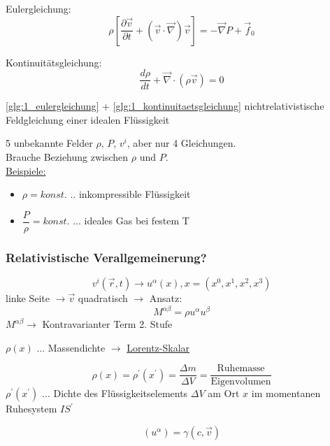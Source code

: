 \documentclass[a4paper, 11pt]{article}
\numberwithin{equation}{section}
\begin{document}
Eulergleichung:
\begin{equation}
\rho \left[ \dfrac{\partial \vec{v}}{\partial t} + \left( \vec{v} \cdot \vec{\nabla} \right) \vec{v} \right] = - \vec{\nabla} P + \vec{f}_0
\label{glg:1_eulergleichung}
\end{equation}

Kontinuitätsgleichung:
\begin{equation}
\dfrac{d \rho}{dt} + \vec{\nabla} \cdot \left( \rho \vec{v} \right) = 0
\label{glg:1_kontinuitaetsgleichung}
\end{equation}

\ref{glg:1_eulergleichung} + \ref{glg:1_kontinuitaetsgleichung} nichtrelativistische Feldgleichung einer idealen Flüssigkeit


5 unbekannte Felder $\rho$, $P$, $v^i$, aber nur 4 Gleichungen.\\
Brauche Beziehung zwischen $\rho$ und $P$.\\
\underline{Beispiele:} 
\begin{itemize}
\item $\rho = konst.$ $..$ inkompressible Flüssigkeit
\item $\dfrac{P}{\rho} = konst.$ $...$ ideales Gas bei festem T 
\end{itemize}

\subsubsection*{Relativistische Verallgemeinerung?}
\begin{equation*}
v^i (\vec{r}, t) \rightarrow u^\alpha(x), x = (x^0, x^1, x^2, x^3)
\end{equation*}
linke Seite $\rightarrow \vec{v}$ quadratisch $\rightarrow$ Ansatz:
\begin{equation}
M^{\alpha \beta} = \rho u^\alpha u^\beta
\end{equation}
$M^{\alpha \beta} \rightarrow$ Kontravarianter Term 2. Stufe 

$\rho(x)$ $...$ Massendichte $\rightarrow$ \underline{Lorentz-Skalar}

\begin{equation*}
\rho(x) = \rho^\prime(x^\prime) = \dfrac{\Delta m}{\Delta V} = \dfrac{\text{Ruhemasse}}{\text{Eigenvolumen}}
\end{equation*}
$\rho^\prime(x^\prime)$ $...$ Dichte des Flüssigkeitselements $\Delta V$ am Ort $x$ im momentanen Ruhesystem $IS^\prime$

\begin{equation}
\left( u^\alpha \right) = \gamma \left( c, \vec{v} \right)
\end{equation}
\end{document}
